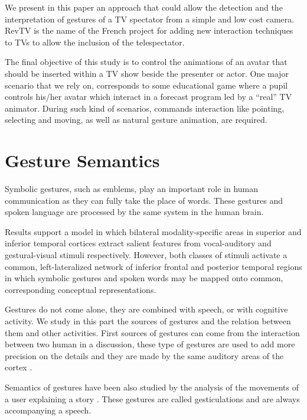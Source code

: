 \documentclass{llncs}
\begin{document}
We present in this paper an approach that could allow the detection and the
interpretation of gestures of a TV spectator from a simple and low cost camera. 
RevTV is the name of the French project for adding new interaction techniques
to TVs to allow the inclusion of the telespectator.

The final objective of this study is to control the animations of an avatar
that should be inserted within a TV show beside the presenter or actor.
One major scenario that we rely on, corresponds to some educational game where a pupil
controls his/her avatar which interact in a forecast program led by a ``real'' TV animator.
During such kind of scenarios, commands interaction
like pointing, selecting and moving, as well as natural gesture animation, are required.


\section{Gesture Semantics}
Symbolic gestures, such as emblems, play an important role in human
communication as they can fully take the place of words.
These gestures and spoken language are processed by the same system in the human brain.

Results support a model in which bilateral modality-specific areas in superior and inferior temporal cortices extract salient features from vocal-auditory and gestural-visual stimuli respectively.
However, both classes of stimuli activate a common, left-lateralized network of inferior frontal and posterior temporal regions in which symbolic gestures and spoken words may be mapped onto common, corresponding conceptual representations.

Gestures do not come alone, they are combined with speech, or with cognitive
activity. We study in this part the sources of gestures and the relation between
them and other activities.
First sources of gestures can come from the interaction between two human in a
discussion, these type of gestures are used to add more precision on the details
and they are made by the same auditory areas of the cortex \cite{SymbolicGest}.

Semantics of gestures have been also studied by the analysis of the movements of
a user explaining a story \cite{gestureThought}.
These gestures are called gesticulations and are always accompanying a speech. 
\end{document}
